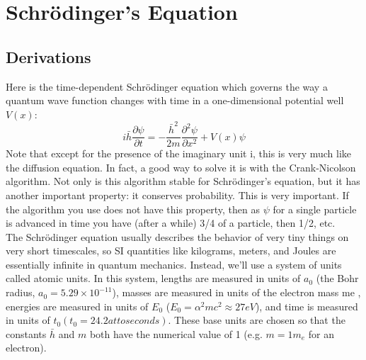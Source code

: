 
\chapter*{Schr{\"o}dinger\rq s Equation}
\section*{Derivations}

Here is the time-dependent Schr{\"o}dinger equation which governs the way a quantum wave function changes with time in a one-dimensional potential well $V(x)$:
\begin{equation}\label{eq:81}
i \bar{h} \frac{\partial \psi}{\partial t}=-\frac{\bar{h}^{2}}{2 m} \frac{\partial^{2} \psi}{\partial x^{2}}+V(x) \psi
\end{equation}
Note that except for the presence of the imaginary unit i, this is very much like
the diffusion equation. In fact, a good way to solve it is with the Crank-Nicolson
algorithm. Not only is this algorithm stable for Schr{\"o}dinger\rq s equation, but it has
another important property: it conserves probability. This is very important. If
the algorithm you use does not have this property, then as $\psi$ for a single particle
is advanced in time you have (after a while) 3/4 of a particle, then 1/2, etc. \\
The Schr{\"o}dinger equation usually describes the behavior of very tiny things
on very short timescales, so SI quantities like kilograms, meters, and Joules are
essentially infinite in quantum mechanics. Instead, we\rq ll use a system of units
called atomic units. In this system, lengths are measured in units of $a_0$ (the Bohr
radius, $a_0 = 5.29×10^{−11}$), masses are measured in units of the electron mass me ,
energies are measured in units of $E_0$ ($E_0 = \alpha^2mc^2 \approx 27 eV$), and time is measured
in units of $t_0 (t_0 = 24.2 attoseconds)$. These base units are chosen so that the
constants $\bar{h}$ and $m$ both have the numerical value of 1 (e.g. $m = 1m_e$ for an electron).

